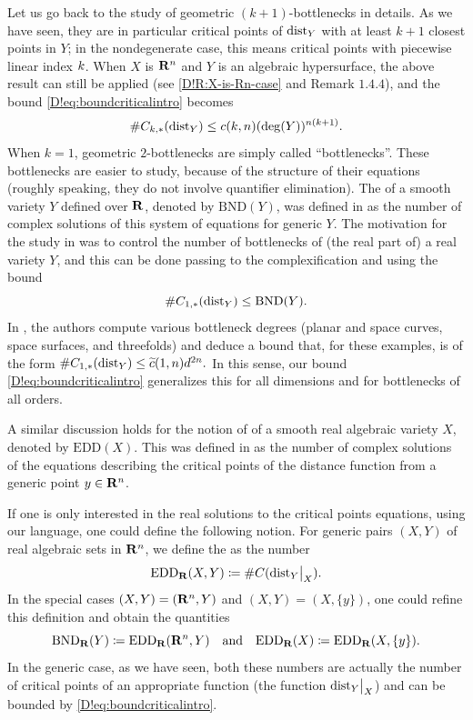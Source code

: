 Let us go back to the study of geometric $(k+1)$-bottlenecks in details. As we have seen, they are in particular critical points of $\operatorname{dist}_Y$ with at least $k+1$ closest points in $Y$; in the nondegenerate case, this means critical points with piecewise linear index $k$. When $X$ is $\mathbf{R}^n$ and $Y$ is an algebraic hypersurface, the above result can still be applied (see \cref{D!R:X-is-Rn-case} and Remark $1.4.4$), and the  bound \eqref{D!eq:boundcriticalintro} becomes
\[
  \#C_{k, *}(\operatorname{dist}_Y) \leq c(k,n)(\deg(Y))^{n (k + 1)}.
\]
When $k = 1$, geometric $2$-bottlenecks are simply called ``bottlenecks''. These bottlenecks are easier to study, because of the structure of their equations (roughly speaking, they do not involve quantifier elimination). The  of a smooth variety $Y$ defined over $\mathbf{R}$, denoted by $\mathrm{BND}(Y)$, was defined in \cite{DREW2020} as the number of complex solutions of this system of equations for generic $Y$.
The motivation for the study in \cite{DREW2020} was to control the number of bottlenecks of (the real part of) a real variety $Y$, and this can be done passing to the complexification and using the bound 
\[\#C_{1,*}(\operatorname{dist}_Y) \leq \mathrm{BND}(Y).\] In \cite{DREW2020}, the authors compute various bottleneck degrees (planar and space curves, space surfaces, and  threefolds) and deduce a bound that, for these examples, is of the form $\#C_{1,*}(\operatorname{dist}_Y) \leq \widetilde{c}(1, n) d^{2n}.$ In this sense, our bound \eqref{D!eq:boundcriticalintro} generalizes this for all dimensions and for bottlenecks of all orders.

A similar discussion holds for the notion of  of a smooth real algebraic variety $X$, denoted by $\mathrm{EDD}(X)$. This was defined in \cite{DHOST2016} as the number of complex solutions of the equations describing the critical points of the distance function from a generic point $y \in \mathbf{R}^n$.

If one is only interested in the real solutions to the critical points equations, using our language, one could define the following notion. For generic pairs $(X, Y)$ of real algebraic sets in $\mathbf{R}^n$, we define the  as the number
\[
  \mathrm{EDD}_{\mathbf{R}}(X, Y) \coloneq \#C(\mathord{\operatorname{dist}}_Y\big|_X).
\]
In the special cases $(X, Y) = (\mathbf{R}^n, Y)$ and $(X, Y) = (X, \{y\})$, one could refine this definition and obtain the quantities
\[
  \mathrm{BND}_{\mathbf{R}}(Y) \coloneq \mathrm{EDD}_{\mathbf{R}}(\mathbf{R}^n,Y) \quad \textrm{and} \quad \mathrm{EDD}_{\mathbf{R}}(X) \coloneq \mathrm{EDD}_{\mathbf{R}}(X, \{y\}).
\]
In the generic case, as we have seen, both these numbers are actually the number of critical points of an appropriate function (the function $\mathord{\operatorname{dist}}_Y\big|_X$) and can be bounded by \eqref{D!eq:boundcriticalintro}. 

